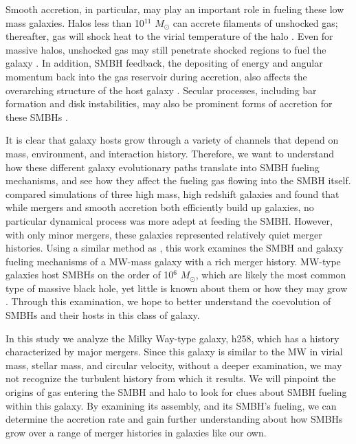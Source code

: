 \documentclass[]{emulateapj}
\begin{document}
Smooth accretion, in particular, may play an important role in fueling these low mass galaxies. Halos less than 10$^{11}$ $M_{\odot}$ can accrete filaments of unshocked gas; thereafter, gas will shock heat to the virial temperature of the halo \citep{Keres2005}. Even for massive halos, unshocked gas may still penetrate shocked regions to fuel the galaxy \citep{Brooks2009,Dekel2009,Nelson2013}. In addition, SMBH feedback, the depositing of energy and angular momentum back into the gas reservoir during accretion, also affects the overarching structure of the host galaxy \citep{Governato2009a}. Secular processes, including bar formation and disk instabilities, may also be prominent forms of accretion for these SMBHs \citep{Kormendy2013}. 

It is clear that galaxy hosts grow through a variety of channels that depend on mass, environment, and interaction history. Therefore, we want to understand how these different galaxy evolutionary paths translate into SMBH fueling mechanisms, and see how they affect the fueling gas flowing into the SMBH itself. \cite{Bellovary2013} compared simulations of three high mass, high redshift galaxies and found that while mergers and smooth accretion both efficiently build up galaxies, no particular dynamical process was more adept at feeding the SMBH. However, with only minor mergers, these galaxies represented relatively quiet merger histories. Using a similar method as \cite{Bellovary2013}, this work examines the SMBH and galaxy fueling mechanisms of a MW-mass galaxy with a rich merger history. MW-type galaxies host SMBHs on the order of 10$^6$ $M_{\odot}$, which are likely the most common type of massive black hole, yet little is known about them or how they may grow \citep{Kormendy2013}. Through this examination, we hope to better understand the coevolution of SMBHs and their hosts in this class of galaxy. 

In this study we analyze the Milky Way-type galaxy, h258, which has a history characterized by major mergers. Since this galaxy is similar to the MW in virial mass, stellar mass, and circular velocity, without a deeper examination, we may not recognize the turbulent history from which it results. We will pinpoint the origins of gas entering the SMBH and halo to look for clues about SMBH fueling within this galaxy. By examining its assembly, and its SMBH's fueling, we can determine the accretion rate and gain further understanding about how SMBHs grow over a range of merger histories in galaxies like our own.
\end{document}
